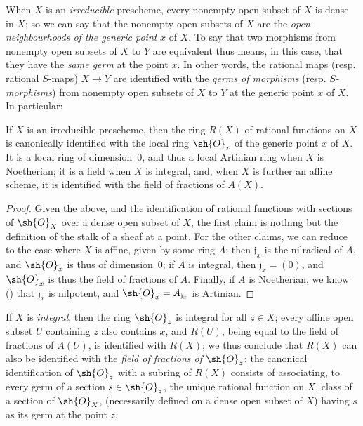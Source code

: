 \begin{env}[7.1.4]
\label{I.7.1.4}
When $X$ is an \emph{irreducible} prescheme, every nonempty open subset of $X$ is dense in $X$; so we can say that the nonempty open subsets of $X$ are the \emph{open neighbourhoods of the generic point} $x$ of $X$.
To say that two morphisms from nonempty open subsets of $X$ to $Y$ are equivalent thus means, in this case, that they have the \emph{same germ} at the point $x$.
In other words, the rational maps (resp. rational $S$-maps) $X\to Y$ are identified with the \emph{germs of morphisms} (resp. \emph{$S$-morphisms}) from nonempty open subsets of $X$ to $Y$ at the generic point $x$ of $X$.
In particular:
\end{env}

\begin{proposition}[7.1.5]
\label{I.7.1.5}
If $X$ is an irreducible prescheme, then the ring $R(X)$ of rational functions on $X$ is canonically identified with the local ring $\sh{O}_x$ of the generic point $x$ of $X$.
It is a local ring of dimension~0, and thus a local Artinian ring when $X$ is Noetherian; it is a field when $X$ is integral, and, when $X$ is further an affine scheme, it is identified with the field of fractions of $A(X)$.
\end{proposition}

\begin{proof}
Given the above, and the identification of rational functions with sections of $\sh{O}_X$ over a dense open subset of $X$, the first claim is nothing but the definition of the stalk of a sheaf at a point.
For the other claims, we can reduce to the case where $X$ is affine, given by some ring $A$; then $\mathfrak{j}_x$ is the nilradical of $A$, and $\sh{O}_x$ is thus of dimension~0; if $A$ is integral, then $\mathfrak{j}_x=(0)$, and $\sh{O}_x$ is thus the field of fractions of $A$.
Finally, if $A$ is Noetherian, we know (\cite[p.~127, cor.~4]{I-11}) that $\mathfrak{j}_x$ is nilpotent, and $\sh{O}_x=A_{\mathfrak{j}_x}$ is Artinian.
\end{proof}

If $X$ is \emph{integral}, then the ring $\sh{O}_z$ is integral for all $z\in X$; every affine open subset $U$ containing $z$ also contains $x$, and $R(U)$, being equal to the field of fractions of $A(U)$, is identified with $R(X)$; we thus conclude that $R(X)$ can also be identified with the \emph{field of fractions of $\sh{O}_z$}: the canonical identification of $\sh{O}_z$ with a subring of $R(X)$ consists of associating, to every germ of a section $s\in\sh{O}_z$, the unique rational function on $X$, class of a section of $\sh{O}_X$, (necessarily defined on a dense open subset of $X$) having $s$ as its germ at the point $z$.

